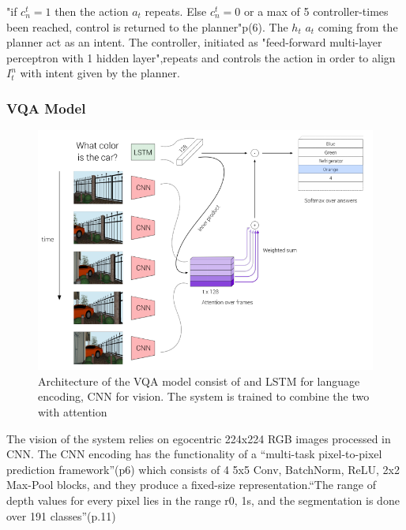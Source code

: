 "if \begin{math} c_{n}^{t} = 1 \end{math} then the action \begin{math} a_{t} \end{math} repeats. Else \begin{math} c_{n}^{t} = 0 \end{math} or a max of 5 controller-times been reached, control is returned to the planner"p(6). The \begin{math} h_{t} \end{math}   \begin{math} a_{t} \end{math} coming from the planner act as an intent. The controller, initiated  as "feed-forward multi-layer perceptron with 1 hidden layer",repeats and controls the action in order to align \begin{math}  I_{t}^{n} \end{math} with intent given by the planner. 

\subsubsection{VQA Model}

\begin{figure}[H]
\centering
\includegraphics[scale=0.35]{latex/images/VQA.png}
\caption{Architecture of the VQA model consist of and LSTM for language encoding, CNN for vision. The system is trained to combine the two with attention}
\label{fig:VQ}
\end{figure}

The vision of the system relies on egocentric 224x224 RGB images processed in CNN. The CNN encoding has the functionality of a “multi-task pixel-to-pixel prediction framework”(p6)  which consists of 4 {5x5 Conv, BatchNorm, ReLU, 2x2 Max-Pool blocks}, and they produce a fixed-size representation.“The range of depth values for every pixel lies in the range r0, 1s, and the segmentation is done over 191 classes”(p.11) \cite{embodiedqa}  







